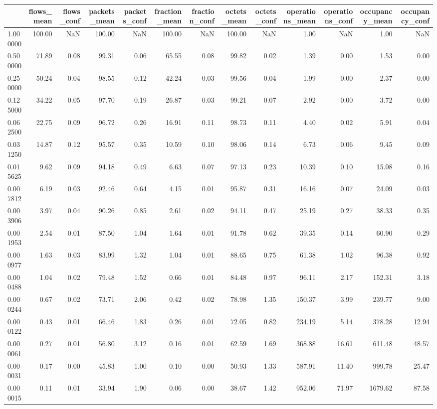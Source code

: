 \begin{tabular}{lrrrrrrrrrrrr}
\toprule
 & flows_mean & flows_conf & packets_mean & packets_conf & fraction_mean & fraction_conf & octets_mean & octets_conf & operations_mean & operations_conf & occupancy_mean & occupancy_conf \\
\midrule
1.000000 & 100.00 & NaN & 100.00 & NaN & 100.00 & NaN & 100.00 & NaN & 1.00 & NaN & 1.00 & NaN \\
0.500000 & 71.89 & 0.08 & 99.31 & 0.06 & 65.55 & 0.08 & 99.82 & 0.02 & 1.39 & 0.00 & 1.53 & 0.00 \\
0.250000 & 50.24 & 0.04 & 98.55 & 0.12 & 42.24 & 0.03 & 99.56 & 0.04 & 1.99 & 0.00 & 2.37 & 0.00 \\
0.125000 & 34.22 & 0.05 & 97.70 & 0.19 & 26.87 & 0.03 & 99.21 & 0.07 & 2.92 & 0.00 & 3.72 & 0.00 \\
0.062500 & 22.75 & 0.09 & 96.72 & 0.26 & 16.91 & 0.11 & 98.73 & 0.11 & 4.40 & 0.02 & 5.91 & 0.04 \\
0.031250 & 14.87 & 0.12 & 95.57 & 0.35 & 10.59 & 0.10 & 98.06 & 0.14 & 6.73 & 0.06 & 9.45 & 0.09 \\
0.015625 & 9.62 & 0.09 & 94.18 & 0.49 & 6.63 & 0.07 & 97.13 & 0.23 & 10.39 & 0.10 & 15.08 & 0.16 \\
0.007812 & 6.19 & 0.03 & 92.46 & 0.64 & 4.15 & 0.01 & 95.87 & 0.31 & 16.16 & 0.07 & 24.09 & 0.03 \\
0.003906 & 3.97 & 0.04 & 90.26 & 0.85 & 2.61 & 0.02 & 94.11 & 0.47 & 25.19 & 0.27 & 38.33 & 0.35 \\
0.001953 & 2.54 & 0.01 & 87.50 & 1.04 & 1.64 & 0.01 & 91.78 & 0.62 & 39.35 & 0.14 & 60.90 & 0.29 \\
0.000977 & 1.63 & 0.03 & 83.99 & 1.32 & 1.04 & 0.01 & 88.65 & 0.75 & 61.38 & 1.02 & 96.38 & 0.92 \\
0.000488 & 1.04 & 0.02 & 79.48 & 1.52 & 0.66 & 0.01 & 84.48 & 0.97 & 96.11 & 2.17 & 152.31 & 3.18 \\
0.000244 & 0.67 & 0.02 & 73.71 & 2.06 & 0.42 & 0.02 & 78.98 & 1.35 & 150.37 & 3.99 & 239.77 & 9.00 \\
0.000122 & 0.43 & 0.01 & 66.46 & 1.83 & 0.26 & 0.01 & 72.05 & 0.82 & 234.19 & 5.14 & 378.28 & 12.94 \\
0.000061 & 0.27 & 0.01 & 56.80 & 3.12 & 0.16 & 0.01 & 62.59 & 1.69 & 368.88 & 16.61 & 611.48 & 48.57 \\
0.000031 & 0.17 & 0.00 & 45.83 & 1.00 & 0.10 & 0.00 & 50.93 & 1.33 & 587.91 & 11.40 & 999.78 & 25.47 \\
0.000015 & 0.11 & 0.01 & 33.94 & 1.90 & 0.06 & 0.00 & 38.67 & 1.42 & 952.06 & 71.97 & 1679.62 & 87.58 \\

\end{tabular}
